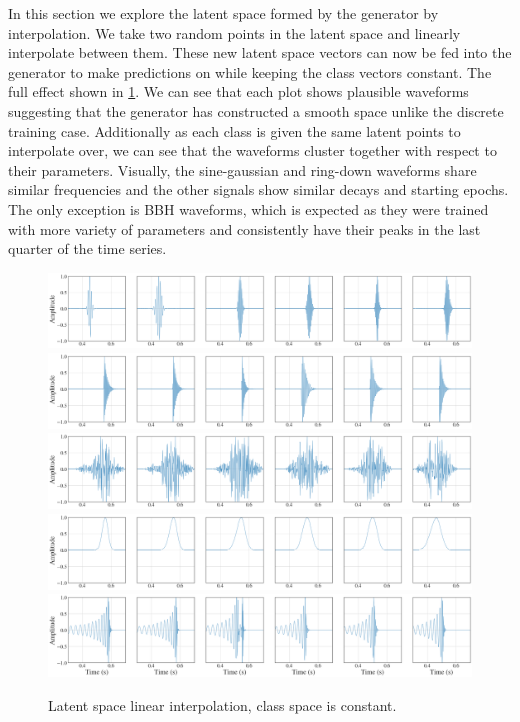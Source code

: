 \documentclass[12pt]{iopart}
\begin{document}
In this section we explore the latent space formed by the generator by interpolation. We take two random points in the latent space and linearly interpolate between them. These new latent space vectors can now be fed into the generator to make predictions on while keeping the class vectors constant. The full effect shown in \cref{fig:z_interp}. We can see that each plot shows plausible waveforms suggesting that the generator has constructed a smooth space unlike the discrete training case. Additionally as each class is given the same latent points to interpolate over, we can see that the waveforms cluster together with respect to their parameters. Visually, the sine-gaussian and ring-down waveforms share similar frequencies and the other signals show similar decays and starting epochs. The only exception is BBH waveforms, which is expected as they were trained with more variety of parameters and consistently have their peaks in the last quarter of the time series.

\begin{figure}
    \centering
    \includegraphics[width=\textwidth]{figures/generations/z_interp_sg.png}
    \includegraphics[width=\textwidth]{figures/generations/z_interp_rd.png}
    \includegraphics[width=\textwidth]{figures/generations/z_interp_wnb.png}
    \includegraphics[width=\textwidth]{figures/generations/z_interp_blip.png}
    \includegraphics[width=\textwidth]{figures/generations/z_interp_bbh.png}
    \caption{Latent space linear interpolation, class space is constant.}
    \label{fig:z_interp}
\end{figure}
\end{document}
